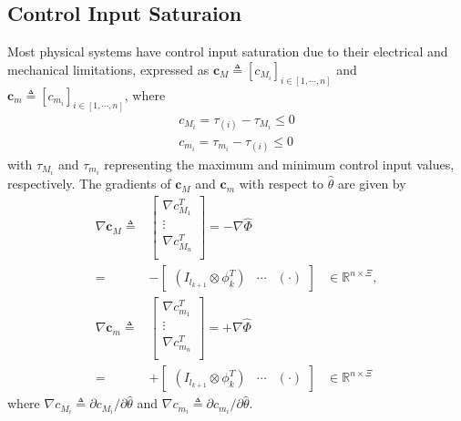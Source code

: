 \documentclass[lettersize,journal]{IEEEtran}
\begin{document}
\subsection{Control Input Saturaion}

Most physical systems have control input saturation due to their electrical and mechanical limitations, expressed as $\mathbf{c}_{M}\triangleq [c_{M_i}]_{i\in[1,\cdots,n]}$ and $\mathbf{c}_{m}\triangleq [c_{m_i}]_{i\in[1,\cdots,n]}$, where
\begin{equation}
    \begin{aligned}
        c_{M_i}=\tau_{(i)} - {\tau_{M_i}} \le 0
        \\
        c_{m_i}={\tau_{m_i}}-\tau_{(i)} \le 0
    \end{aligned}
    \label{eq. cstr input saturation}
\end{equation}
with $\tau_{M_i}$ and $\tau_{m_i}$ representing the maximum and minimum control input values, respectively.
The gradients of $\mathbf{c}_{M}$ and $\mathbf{c}_{m}$ with respect to $\hat\theta$ are given by
\begin{equation}
    \begin{aligned}
        \nabla \mathbf c_{M} \triangleq
        & 
        \begin{bmatrix}
            \nabla c_{M_1}^T \\
            \vdots \\
            \nabla c_{M_n}^T \\
        \end{bmatrix}
         = -\nabla \hat\Phi
         \\
        =&
        -\begin{bmatrix}
            (I_{l_{k+1}}\otimes \phi_{k}^T)&
            \cdots &
            (
            \cdot
            )
        \end{bmatrix} 
        &
        \in
        \mathbb R^{n\times \Xi}
        , 
        \\
        \nabla \mathbf c_{m}
         \triangleq
        & 
        \begin{bmatrix}
            \nabla c_{m_1}^T \\
            \vdots \\
            \nabla c_{m_n}^T \\
        \end{bmatrix}
        = +\nabla \hat\Phi  
        \\
        =&
        +\begin{bmatrix}
            (I_{l_{k+1}}\otimes \phi_{k}^T)&
            \cdots &
            (
            \cdot
            )
        \end{bmatrix} 
        &
        \in
        \mathbb R^{n\times \Xi}
    \end{aligned}
    \label{eq. nabla input sat}
\end{equation}
where $\nabla c_{M_i}\triangleq \partial c_{M_i}/\partial \hat\theta$ and $\nabla c_{m_i}\triangleq \partial c_{m_i}/\partial \hat\theta$.
\end{document}
